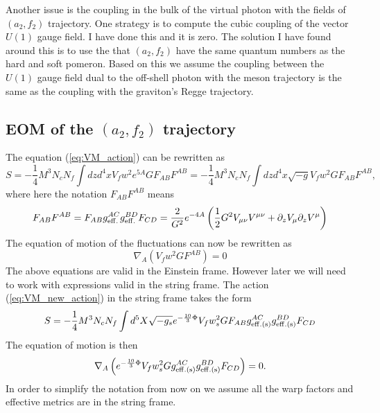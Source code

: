 \documentclass[10 pt]{article}
\begin{document}
Another issue is the coupling in the bulk of the virtual photon with the fields of  $\left(a_2, f_2\right)$ trajectory. One strategy is to compute the cubic coupling of the vector $U\left(1\right)$ gauge field. I have done this and it is zero. The solution I have found around this is to use the that $\left(a_2, f_2\right)$ have the same quantum numbers as the hard and soft pomeron. Based on this we assume the coupling between the $U\left(1\right)$ gauge field dual to the off-shell photon with the meson trajectory is the same as the coupling with the graviton's Regge trajectory.

\subsection{EOM of the $\left(a_2, f_2\right)$ trajectory}

The equation (\ref{eq:VM_action}) can be rewritten as
\begin{equation}
S = - \frac{1}{4} M^3 N_c N_f \int dz d^4 x V_f w^2 e^{5A} G F_{AB}F^{AB} = - \frac{1}{4} M^3 N_c N_f \int dz d^4 x \sqrt{-g} V_f w^2 G F_{AB}F^{AB},
\label{eq:VM_new_action}
\end{equation}
where here the notation $F_{AB}F^{AB}$ means
\begin{equation}
F_{AB}F^{AB} = F_{AB} g_{\rm{eff.}}^{AC} g_{\rm{eff.}}^{BD} F_{CD} =  \frac{2}{G^2}e^{-4A}\left( \frac{1}{2} G^2 V_{\mu \nu} V^{\mu \nu} + \partial_z V_\mu \partial_z V^\mu \right)
\end{equation}
The equation of motion of the fluctuations can now be rewritten as
\begin{equation}
\nabla_A \left(V_f w^2 G F^{AB} \right) = 0
\end{equation}
The above equations are valid in the Einstein frame. However later we will need to work with expressions valid in the string frame. The action (\ref{eq:VM_new_action}) in the string frame takes the form
\begin{equation}
S = - \frac{1}{4} M^3 N_c N_f \int d^5 X \sqrt{-g_s} e^{-\frac{10}{3} \Phi} V_f w_s^2 G F_{AB}g^{AC}_{\rm{eff. (s)}}g^{BD}_{\rm{eff. (s)}}F_{CD}
\label{eq:VM_new_action_string_frame}
\end{equation}
The equation of motion is then
\begin{equation}
\nabla_{A} \left(e^{-\frac{10}{3} \Phi} V_f w_s^2 G g^{AC}_{\rm{eff. (s)}}g^{BD}_{\rm{eff. (s)}}F_{CD}  \right) = 0.
\label{eq:U1_eom_cov_der}
\end{equation}
In order to simplify the notation from now on we assume all the warp factors and effective metrics are in the string frame.
\end{document}
